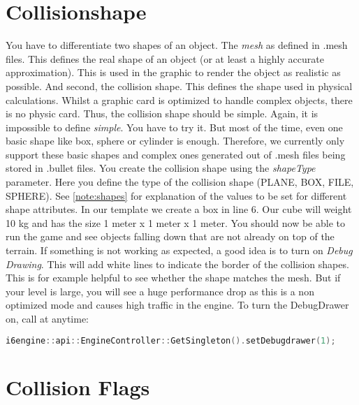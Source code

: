 \documentclass{article}
\begin{document}
\section{Collisionshape}

You have to differentiate two shapes of an object. The \textit{mesh} as defined in .mesh files. This defines the real shape of an object (or at least a highly accurate approximation). This is used in the graphic to render the object as realistic as possible. And second, the collision shape. This defines the shape used in physical calculations. Whilst a graphic card is optimized to handle complex objects, there is no physic card. Thus, the collision shape should be simple. Again, it is impossible to define \textit{simple}. You have to try it. But most of the time, even one basic shape like box, sphere or cylinder is enough. Therefore, we currently only support these basic shapes and complex ones generated out of .mesh files being stored in .bullet files. You create the collision shape using the \textit{shapeType} parameter. Here you define the type of the collision shape (PLANE, BOX, FILE, SPHERE). See \ref{note:shapes} for explanation of the values to be set for different shape attributes. In our template we create a box in line 6. Our cube will weight 10 kg and has the size 1 meter x 1 meter x 1 meter.\newline
You should now be able to run the game and see objects falling down that are not already on top of the terrain. If something is not working as expected, a good idea is to turn on \textit{Debug Drawing}. This will add white lines to indicate the border of the collision shapes. This is for example helpful to see whether the shape matches the mesh. But if your level is large, you will see a huge performance drop as this is a non optimized mode and causes high traffic in the engine. To turn the DebugDrawer on, call at anytime:
\begin{lstlisting}[language=C++, style=basic, caption={enabling debug drawer}, label=code:load]
i6engine::api::EngineController::GetSingleton().setDebugdrawer(1);
\end{lstlisting}

\section{Collision Flags}
\end{document}
